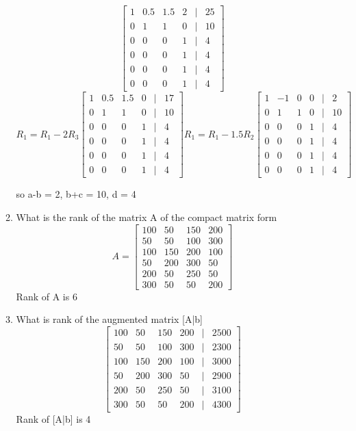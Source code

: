 \documentclass[11pt]{article}
\begin{document}
\begin{enumerate}
\begin{enumerate}
\[\begin{bmatrix}
    1 & 0.5 & 1.5 & 2 &|& 25 \\
    0 & 1 & 1 & 0 &|& 10\\
    0 & 0 & 0 & 1 &|& 4 \\
    0 & 0 & 0 & 1 &|& 4 \\
    0 & 0 & 0 & 1 &|& 4 \\
    0 & 0 & 0 & 1 &|& 4
\end{bmatrix}
\]
\[
R_1 = R_1 - 2R_3
\begin{bmatrix}
    1 & 0.5 & 1.5 & 0 &|& 17 \\
    0 & 1 & 1 & 0 &|& 10\\
    0 & 0 & 0 & 1 &|& 4 \\
    0 & 0 & 0 & 1 &|& 4 \\
    0 & 0 & 0 & 1 &|& 4 \\
    0 & 0 & 0 & 1 &|& 4
\end{bmatrix}
R_1 = R_1 - 1.5R_2
\begin{bmatrix}
    1 & -1 & 0 & 0 &|& 2 \\
    0 & 1 & 1 & 0 &|& 10\\
    0 & 0 & 0 & 1 &|& 4 \\
    0 & 0 & 0 & 1 &|& 4 \\
    0 & 0 & 0 & 1 &|& 4 \\
    0 & 0 & 0 & 1 &|& 4
\end{bmatrix}
\]

so a-b = 2, b+c = 10, d = 4\\


\item What is the rank of the matrix A of the compact matrix form
\[
    A = \begin{bmatrix}
        100 & 50 & 150 & 200 \\
        50 & 50 & 100 & 300 \\
        100 & 150 & 200 & 100 \\
        50 & 200 & 300 & 50 \\
        200 & 50 & 250 & 50 \\
        300 & 50 & 50 & 200
    \end{bmatrix}
\]
Rank of A is 6

\item What is rank of the augmented matrix [A|b]
\[
    \begin{bmatrix}
        100 & 50 & 150 & 200 &|& 2500 \\
        50 & 50 & 100 & 300 &|& 2300 \\
        100 & 150 & 200 & 100 &|& 3000 \\
        50 & 200 & 300 & 50 &|& 2900 \\
        200 & 50 & 250 & 50 &|& 3100 \\
        300 & 50 & 50 & 200 &|& 4300
    \end{bmatrix}
\]
Rank of [A|b] is 4


\end{enumerate}
\end{enumerate}
\end{document}
